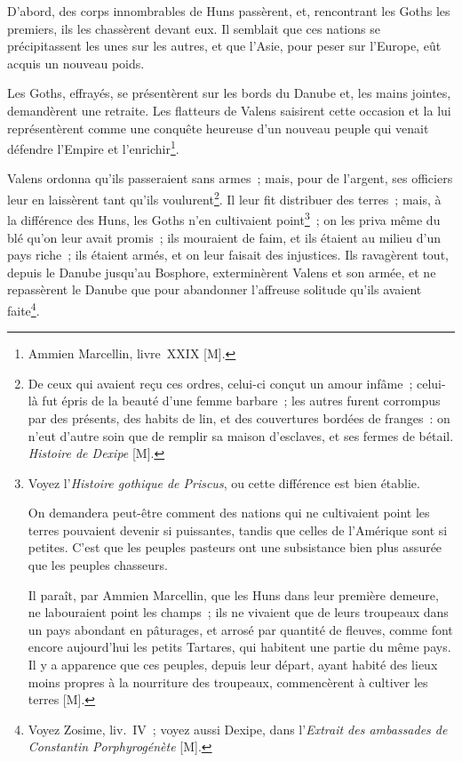 \documentclass[french,twoside]{book} %
\newcommand\chapterclose{} %
\begin{document}
D’abord, des corps innombrables de Huns passèrent, et, rencontrant les Goths les premiers, ils les chassèrent devant eux. Il semblait que ces nations se précipitassent les unes sur les autres, et que l’Asie, pour peser sur l’Europe, eût acquis un nouveau poids.\par
Les Goths, effrayés, se présentèrent sur les bords du Danube et, les mains jointes, demandèrent une retraite. Les flatteurs de Valens saisirent cette occasion et la lui représentèrent comme une conquête heureuse d’un nouveau peuple qui venait défendre l’Empire et l’enrichir\footnote{Ammien Marcellin, livre XXIX [M].}.\par
Valens ordonna qu’ils passeraient sans armes ; mais, pour de l’argent, ses officiers leur en laissèrent tant qu’ils voulurent\footnote{De ceux qui avaient reçu ces ordres, celui-ci conçut un amour infâme ; celui-là fut épris de la beauté d’une femme barbare ; les autres furent corrompus par des présents, des habits de lin, et des couvertures bordées de franges : on n’eut d’autre soin que de remplir sa maison d’esclaves, et ses fermes de bétail. {\itshape Histoire de Dexipe} [M].}. Il leur fit distribuer des terres ; mais, à la différence des Huns, les Goths n’en cultivaient point\footnote{\noindent Voyez l’{\itshape Histoire gothique de Priscus}, ou cette différence est bien établie.\par
On demandera peut-être comment des nations qui ne cultivaient point les terres pouvaient devenir si puissantes, tandis que celles de l’Amérique sont si petites. C’est que les peuples pasteurs ont une subsistance bien plus assurée que les peuples chasseurs.\par
Il paraît, par Ammien Marcellin, que les Huns dans leur première demeure, ne labouraient point les champs ; ils ne vivaient que de leurs troupeaux dans un pays abondant en pâturages, et arrosé par quantité de fleuves, comme font encore aujourd’hui les petits Tartares, qui habitent une partie du même pays. Il y a apparence que ces peuples, depuis leur départ, ayant habité des lieux moins propres à la nourriture des troupeaux, commencèrent à cultiver les terres [M].
} ; on les priva même du blé qu’on leur avait promis ; ils mouraient de faim, et ils étaient au milieu d’un pays riche ; ils étaient armés, et on leur faisait des injustices. Ils ravagèrent tout, depuis le Danube jusqu’au Bosphore, exterminèrent Valens et son armée, et ne repassèrent le Danube que pour abandonner l’affreuse solitude qu’ils avaient faite\footnote{Voyez Zosime, liv. IV ; voyez aussi Dexipe, dans l’{\itshape Extrait des ambassades de Constantin Porphyrogénète} [M].}.
\chapterclose
\end{document}
